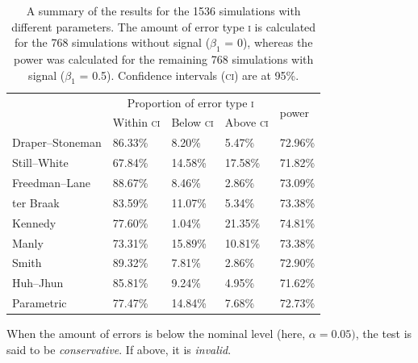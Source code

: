 \begin{table}[!tp]
\caption[Summary of the amount of error type \textsc{i} and power for the different permutation strategies.]{A summary of the results for the 1536 simulations with different parameters. The amount of error type \textsc{i} is calculated for the 768 simulations without signal ($\beta_1$ = 0), whereas the power was calculated for the remaining 768 simulations with signal ($\beta_1$ = 0.5). Confidence intervals (\textsc{ci}) are at 95\%.}
\begin{center}
{\small
\begin{tabular}{@{}m{37mm}<{\raggedright}m{18mm}<{\centering}m{18mm}<{\centering}m{18mm}<{\centering}m{18mm}<{\centering}@{}}
\toprule
\multirow{2}{*}{\raisebox{-3pt}{Method}} &   \multicolumn{3}{c}{Proportion of error type \textsc{i}} & \multirow{2}{19mm}{\raisebox{-3pt}{Average} power}\\
\cmidrule(lr){2-4}
                        & Within \textsc{ci} & Below \textsc{ci} & Above \textsc{ci}\\
\midrule
Draper--Stoneman & 86.33\% &  8.20\% &  5.47\% & 72.96\%\\
Still--White     & 67.84\% & 14.58\% & 17.58\% & 71.82\%\\
Freedman--Lane   & 88.67\% &  8.46\% &  2.86\% & 73.09\%\\
ter Braak        & 83.59\% & 11.07\% &  5.34\% & 73.38\%\\
Kennedy          & 77.60\% &  1.04\% & 21.35\% & 74.81\%\\
Manly            & 73.31\% & 15.89\% & 10.81\% & 73.38\%\\
Smith            & 89.32\% &  7.81\% &  2.86\% & 72.90\%\\
Huh--Jhun        & 85.81\% &  9.24\% &  4.95\% & 71.62\%\\
Parametric       & 77.47\% & 14.84\% &  7.68\% & 72.73\%\\
\bottomrule
\end{tabular}}
\end{center}
{\footnotesize
When the amount of errors is below the nominal level (here, $\alpha=0.05)$, the test is said to be \emph{conservative}. If above, it is \emph{invalid}.\par}
\label{tab:summary}
\end{table}

